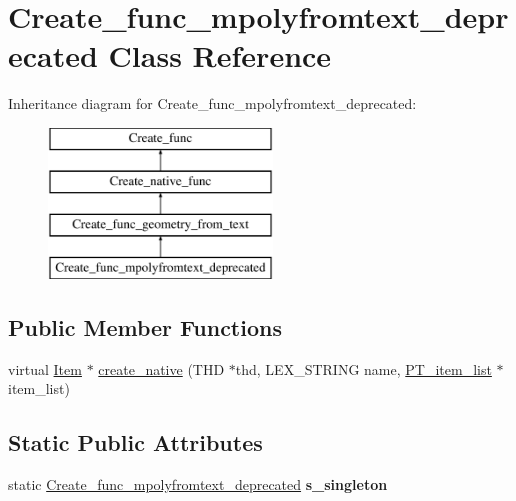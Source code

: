 \hypertarget{classCreate__func__mpolyfromtext__deprecated}{}\section{Create\+\_\+func\+\_\+mpolyfromtext\+\_\+deprecated Class Reference}
\label{classCreate__func__mpolyfromtext__deprecated}
Inheritance diagram for Create\+\_\+func\+\_\+mpolyfromtext\+\_\+deprecated\+:\begin{figure}[H]
\begin{center}
\leavevmode
\includegraphics[height=4.000000cm]{classCreate__func__mpolyfromtext__deprecated}
\end{center}
\end{figure}
\subsection*{Public Member Functions}
\begin{DoxyCompactItemize}
\item 
virtual \mbox{\hyperlink{classItem}{Item}} $\ast$ \mbox{\hyperlink{classCreate__func__mpolyfromtext__deprecated_af27e8741d038b263573cd51ad78608c3}{create\+\_\+native}} (T\+HD $\ast$thd, L\+E\+X\+\_\+\+S\+T\+R\+I\+NG name, \mbox{\hyperlink{classPT__item__list}{P\+T\+\_\+item\+\_\+list}} $\ast$item\+\_\+list)
\end{DoxyCompactItemize}
\subsection*{Static Public Attributes}
\begin{DoxyCompactItemize}
\item 
\mbox{\label{classCreate__func__mpolyfromtext__deprecated_ad8254abd47321283a8942d22b6976d2a}} 
static \mbox{\hyperlink{classCreate__func__mpolyfromtext__deprecated}{Create\+\_\+func\+\_\+mpolyfromtext\+\_\+deprecated}} {\bfseries s\+\_\+singleton}
\end{DoxyCompactItemize}
